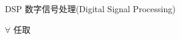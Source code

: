\begin{denotation}
\item[DSP] 数字信号处理(Digital Signal Processing)
\item[$\forall$] 任取


\end{denotation}
